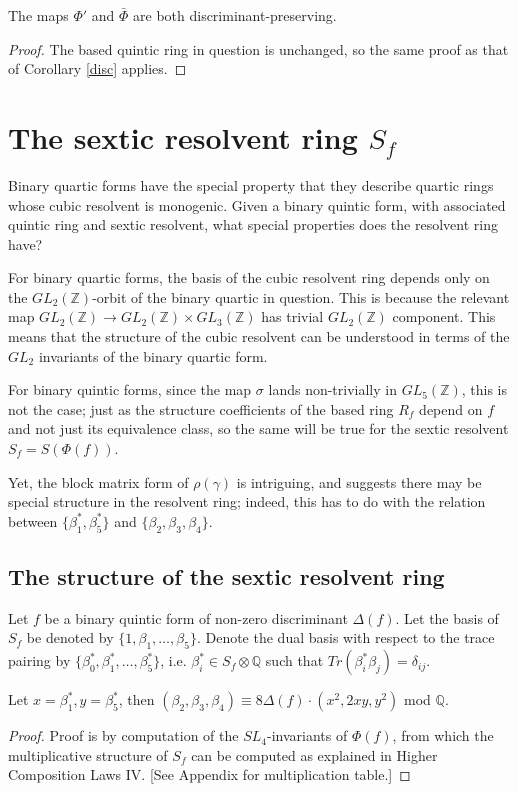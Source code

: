 \documentclass{article}
\begin{document}
\begin{corollary}
The maps $\Phi'$ and $\bar{\Phi}$ are both discriminant-preserving.
\end{corollary}
\begin{proof}
The based quintic ring in question is unchanged, so the same proof as that of Corollary \ref{disc} applies.
\end{proof}

\section{The sextic resolvent ring $S_f$}

Binary quartic forms have the special property that they describe quartic rings whose cubic resolvent is monogenic.  Given a binary quintic form, with associated quintic ring and sextic resolvent, what special properties does the resolvent ring have?

For binary quartic forms, the basis of the cubic resolvent ring depends only on the $GL_2(\mathbb{Z})$-orbit of the binary quartic in question.  This is because the relevant map $GL_2(\mathbb{Z}) \to GL_2(\mathbb{Z}) \times GL_3(\mathbb{Z})$ has trivial $GL_2(\mathbb{Z})$ component.  This means that the structure of the cubic resolvent can be understood in terms of the $GL_2$ invariants of the binary quartic form.

For binary quintic forms, since the map $\sigma$ lands non-trivially in $GL_5(\mathbb{Z})$, this is not the case; just as the structure coefficients of the based ring $R_f$ depend on $f$ and not just its equivalence class, so the same will be true for the sextic resolvent $S_f = S(\Phi(f))$.

Yet, the block matrix form of $\rho(\gamma)$ is intriguing, and suggests there may be special structure in the resolvent ring; indeed, this has to do with the relation between $\{ \beta_1^*, \beta_5^* \}$ and $\{ \beta_2, \beta_3, \beta_4 \}$.

\subsection{The structure of the sextic resolvent ring}

\begin{theorem} \label{sextic structure2}
Let $f$ be a binary quintic form of non-zero discriminant $\Delta(f)$.  Let the basis of $S_f$ be denoted by $\{1,\beta_1,\ldots,\beta_5\}$.  Denote the dual basis with respect to the trace pairing by $\{\beta_0^*,\beta_1^*,\ldots,\beta_5^*\}$, i.e. $\beta_i^* \in S_f \otimes \mathbb{Q}$ such that $Tr(\beta_i^* \beta_j) = \delta_{ij}$.

Let $x = \beta_1^*, y = \beta_5^*$, then $(\beta_2,\beta_3,\beta_4) \equiv 8 \Delta(f) \cdot ( x^2, 2 x y, y^2 )$ mod $\mathbb{Q}$.
\end{theorem}
\begin{proof}
Proof is by computation of the $SL_4$-invariants of $\Phi(f)$, from which the multiplicative structure of $S_f$ can be computed as explained in Higher Composition Laws IV.  [See Appendix for multiplication table.]
\end{proof}
\end{document}
